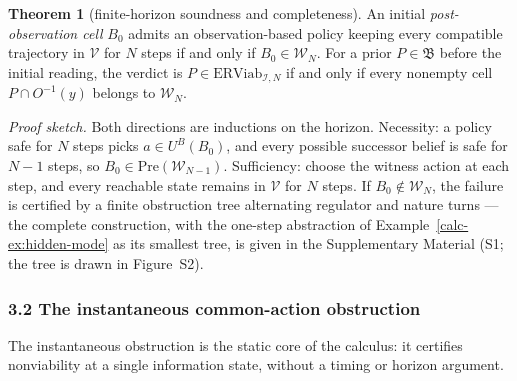 \documentclass[10pt,twocolumn]{article}
\theoremstyle{definition}
\newtheorem{theorem}{Theorem}
\begin{document}
\begin{theorem}[finite-horizon soundness and completeness]\label{calc-thm:finite-horizon}
An initial \emph{post-observation cell} \(B_0\) admits an observation-based
policy keeping every compatible trajectory in \(\mathcal V\) for
\(N\) steps if and only if \(B_0\in\mathcal W_N\). For a prior
\(P\in\mathfrak B\) before the initial reading, the verdict is
\(P\in\mathrm{ERViab}_{\mathcal I,N}\) if and only if every
nonempty cell \(P\cap O^{-1}(y)\) belongs to \(\mathcal W_N\).
\end{theorem}

\emph{Proof sketch.} Both directions are inductions on the horizon. Necessity: a policy safe for \(N\) steps picks \(a \in U^B(B_0)\), and every possible successor belief is safe for \(N - 1\) steps, so \(B_0 \in \mathrm{Pre}(\mathcal{W}_{N-1})\). Sufficiency: choose the witness action at each step, and every reachable state remains in \(\mathcal{V}\) for \(N\) steps. If \(B_0 \notin \mathcal{W}_N\), the failure is certified by a finite obstruction tree alternating regulator and nature turns --- the complete construction, with the one-step abstraction of Example~\ref{calc-ex:hidden-mode} as its smallest tree, is given in the Supplementary Material (S1; the tree is drawn in Figure~S2).

\subsubsection{3.2 The instantaneous common-action
obstruction}\label{calc-the-instantaneous-common-action-obstruction}

The instantaneous obstruction is the static core of the calculus: it certifies nonviability at a single information state, without a timing or horizon argument.
\end{document}
